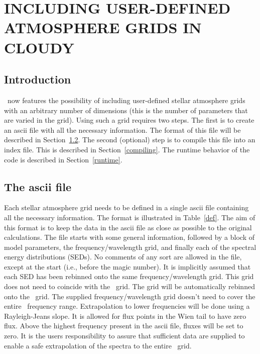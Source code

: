 \chapter{INCLUDING USER-DEFINED ATMOSPHERE GRIDS IN CLOUDY}

\section{Introduction}

\Cloudy\ now features the possibility of including user-defined stellar
atmosphere grids with an arbitrary number of dimensions (this is the number of
parameters that are varied in the grid). Using such a grid requires two steps.
The first is to create an ascii file with all the necessary information. The
format of this file will be described in Section~\ref{ascii}. The second
(optional) step is to compile this file into an index file. This is described
in Section~\ref{compiling}. The runtime behavior of the code is described in
Section~\ref{runtime}.

\section{The ascii file}
\label{ascii}

Each stellar atmosphere grid needs to be defined in a single ascii file
containing all the necessary information. The format is illustrated in
Table~\ref{def}. The aim of this format is to keep the data in the ascii file
as close as possible to the original calculations. The file starts with some
general information, followed by a block of model parameters, the
frequency/wavelength grid, and finally each of the spectral energy
distributions (SEDs). No comments of any sort are allowed in the file, except
at the start (i.e., before the magic number). It is implicitly assumed that
each SED has been rebinned onto the same frequency/wavelength grid. This grid
does not need to coincide with the \Cloudy\ grid. The grid will be automatically
rebinned onto the \Cloudy\ grid. The supplied frequency/wavelength grid doesn't
need to cover the entire \Cloudy\ frequency range. Extrapolation to lower
frequencies will be done using a Rayleigh-Jeans slope. It is allowed for flux
points in the Wien tail to have zero flux. Above the highest frequency present
in the ascii file, fluxes will be set to zero. It is the users responsibility
to assure that sufficient data are supplied to enable a safe extrapolation of
the spectra to the entire \Cloudy\ grid.

